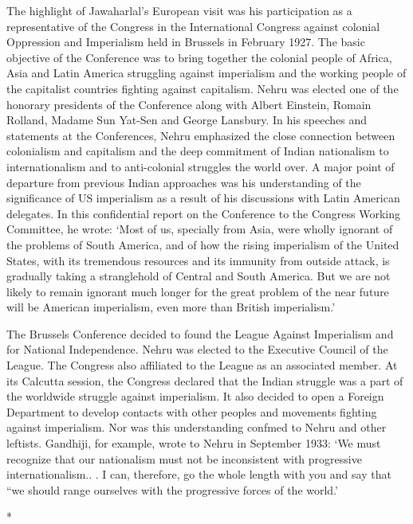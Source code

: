 The highlight of Jawaharlal's European visit was his participation as a representative of the Congress in the International Congress against colonial Oppression and Imperialism held in Brussels in February 1927. The basic objective of the Conference was to bring together the colonial people of Africa, Asia and Latin America struggling against imperialism and the working people of the capitalist countries fighting against capitalism. Nehru was elected one of the honorary presidents of the Conference along with Albert Einstein, Romain Rolland, Madame Sun Yat-Sen and George Lansbury. In his speeches and statements at the Conferences, Nehru emphasized the close connection between colonialism and capitalism and the deep commitment of Indian nationalism to internationalism and to anti-colonial struggles the world over. A major point of departure from previous Indian approaches was his understanding of the significance of US imperialism as a result of his discussions with Latin American delegates. In this confidential report on the Conference to the Congress Working Committee, he wrote: `Most of us, specially from Asia, were wholly ignorant of the problems of South America, and of how the rising imperialism of the United States, with its tremendous resources and its immunity from outside attack, is gradually taking a stranglehold of Central and South America. But we are not likely to remain ignorant much longer for the great problem of the near future will be American imperialism, even more than British imperialism.' 

The Brussels Conference decided to found the League Against Imperialism and for National Independence. Nehru was elected to the Executive Council of the League. The Congress also affiliated to the League as an associated member. At its Calcutta session, the Congress declared that the Indian struggle was a part of the worldwide struggle against imperialism. It also decided to open a Foreign Department to develop contacts with other peoples and movements fighting against imperialism. Nor was this understanding confmed to Nehru and other leftists. Gandhiji, for example, wrote to Nehru in September 1933: `We must recognize that our nationalism must not be inconsistent with progressive internationalism.. . I can, therefore, go the whole length with you and say that ``we should range ourselves with the progressive forces of the world.'

\begin{center}*\end{center}


